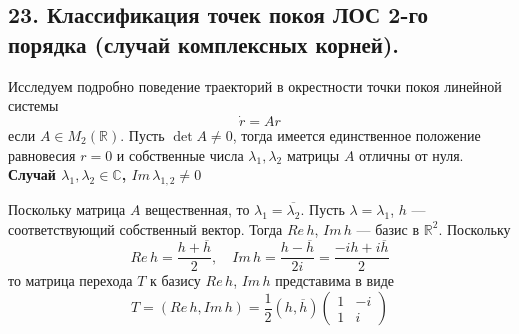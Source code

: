 \subsection*{23. Классификация точек покоя ЛОС 2-го порядка (случай комплексных корней).}

Исследуем подробно поведение траекторий в окрестности точки покоя линейной системы
\begin{equation*}
    \dot{r} = Ar
\end{equation*}
если $A \in M_2(\mathbb{R})$. Пусть $\det A \neq 0$, тогда имеется единственное положение равновесия $r = 0$ и собственные числа $\lambda_1, \lambda_2$ матрицы $A$ отличны от нуля.\\

\noindent \textbf{Случай $\lambda_1, \lambda_2 \in \mathbb{C}$, $Im\, \lambda_{1,2} \neq 0$}

Поскольку матрица $A$ вещественная, то $\lambda_1 = \overline{\lambda_2}$. Пусть $\lambda = \lambda_1$, $h$ --- соответствующий собственный вектор. Тогда $Re\, h$, $Im\, h$ --- базис в $\mathbb{R}^2$. Поскольку
\begin{equation*}
    Re\, h = \frac{h + \overline{h}}{2}, \quad Im\, h = \frac{h - \overline{h}}{2i} = \frac{-ih + i\overline{h}}{2}
\end{equation*}
то матрица перехода $T$ к базису $Re\, h$, $Im\, h$ представима в виде
\begin{equation*}
    T = (Re\, h, Im\, h) = \frac{1}{2}(h,\overline{h})
    \begin{pmatrix}
        1 & -i \\
        1 & i
    \end{pmatrix}
\end{equation*}

